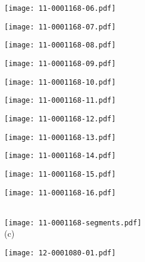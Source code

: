 \documentclass[10pt,twocolumn,letterpaper]{article}
\begin{document}
\begin{figure*}[t]
 \begin{minipage}{0.058\textwidth} \centering \texttt{[image: 11-0001168-06.pdf]} \end{minipage}
 \begin{minipage}{0.058\textwidth} \centering \texttt{[image: 11-0001168-07.pdf]} \end{minipage}
 \begin{minipage}{0.058\textwidth} \centering \texttt{[image: 11-0001168-08.pdf]} \end{minipage}
 \begin{minipage}{0.058\textwidth} \centering \texttt{[image: 11-0001168-09.pdf]} \end{minipage}
 \begin{minipage}{0.058\textwidth} \centering \texttt{[image: 11-0001168-10.pdf]} \end{minipage}
 \begin{minipage}{0.058\textwidth} \centering \texttt{[image: 11-0001168-11.pdf]} \end{minipage}
 \begin{minipage}{0.058\textwidth} \centering \texttt{[image: 11-0001168-12.pdf]} \end{minipage}
 \begin{minipage}{0.058\textwidth} \centering \texttt{[image: 11-0001168-13.pdf]} \end{minipage}
 \begin{minipage}{0.058\textwidth} \centering \texttt{[image: 11-0001168-14.pdf]} \end{minipage}
 \begin{minipage}{0.058\textwidth} \centering \texttt{[image: 11-0001168-15.pdf]} \end{minipage}
 \begin{minipage}{0.058\textwidth} \centering \texttt{[image: 11-0001168-16.pdf]} \end{minipage}
 \\ \vspace{2mm}
 \texttt{[image: 11-0001168-segments.pdf]}
 \\
 (c)
 \\ \vspace{2mm}
 \begin{minipage}{0.058\textwidth} \centering \texttt{[image: 12-0001080-01.pdf]} \end{minipage}

\end{figure*}
\end{document}
